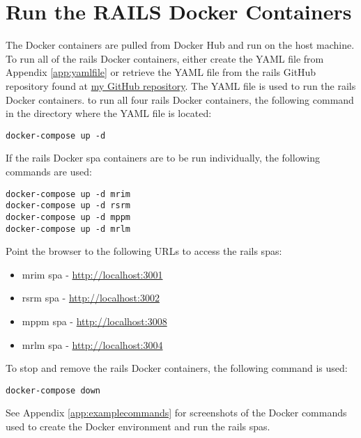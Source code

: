 \section{Run the RAILS Docker Containers}
\label{sec:railsdockercontainers}
The Docker containers are pulled from Docker Hub and run on the host machine. To run all of the \gls{rails} Docker containers, either create the YAML file from Appendix \ref{app:yamlfile} or retrieve the YAML file from the \gls{rails} GitHub repository found at \href{https://github.com/djbristow/RAILS/tree/master/Docker%20Based}{my GitHub repository}. The YAML file is used to run the \gls{rails} Docker containers.  
to run all four \gls{rails} Docker containers, the following command in the directory where the YAML file is located:
\begin{verbatim}
docker-compose up -d
\end{verbatim}
If the \gls{rails} Docker \gls{spa} containers are to be run individually, the following commands are used:
\begin{verbatim}
docker-compose up -d mrim
docker-compose up -d rsrm
docker-compose up -d mppm
docker-compose up -d mrlm
\end{verbatim}
Point the browser to the following URLs to access the \gls{rails} \glspl{spa}:
\begin{itemize}
    \item \gls{mrim} \gls{spa} - \href{http://localhost:3001}{http://localhost:3001}
    \item \gls{rsrm} \gls{spa} - \href{http://localhost:3002}{http://localhost:3002}
    \item \gls{mppm} \gls{spa} - \href{http://localhost:3008}{http://localhost:3008}
    \item \gls{mrlm} \gls{spa} - \href{http://localhost:3004}{http://localhost:3004}
\end{itemize}
To stop and remove the \gls{rails} Docker containers, the following command is used:
\begin{verbatim}
docker-compose down
\end{verbatim}

See Appendix \ref{app:examplecommands} for screenshots of the Docker commands used to create the Docker environment and run the \gls{rails} \glspl{spa}.
